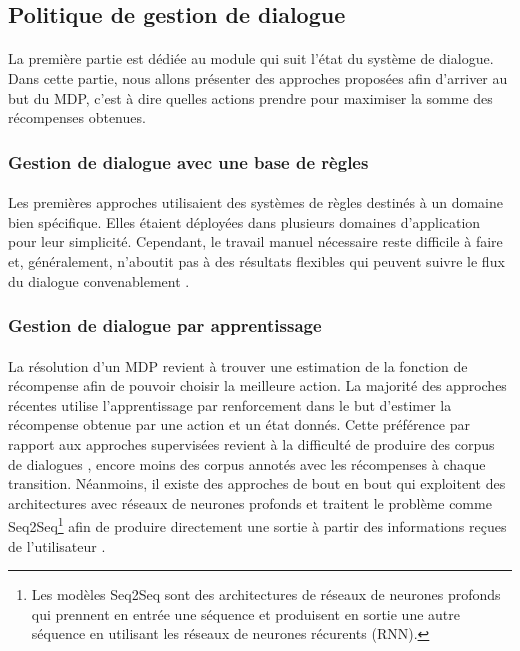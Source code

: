 \subsection{Politique de gestion de dialogue}
\paragraph{}
La première partie est dédiée au module qui suit l'état du système de dialogue. Dans cette partie, nous allons présenter des approches proposées afin d'arriver au but du MDP, c'est à dire quelles actions prendre pour maximiser la somme des récompenses obtenues.
\subsubsection{Gestion de dialogue avec une base de règles}
\paragraph{}
Les premières approches utilisaient des systèmes de règles destinés à un domaine bien spécifique. Elles étaient déployées dans plusieurs domaines d'application pour leur simplicité. Cependant, le travail manuel nécessaire reste difficile à faire et, généralement, n'aboutit pas à des résultats flexibles qui peuvent suivre le flux du dialogue convenablement \citep{Lee2010}.
\subsubsection{Gestion de dialogue par apprentissage}
\paragraph{}
La résolution d'un MDP revient à trouver une estimation de la fonction de récompense afin de pouvoir choisir la meilleure action. La majorité des approches récentes utilise l'apprentissage par renforcement dans le but d'estimer la récompense obtenue par une action et un état donnés. Cette préférence par rapport aux approches supervisées revient à la difficulté de produire des corpus de dialogues \citep{Henderson2008}, encore moins des corpus annotés avec les récompenses à chaque transition. Néanmoins, il existe des approches de bout en bout qui exploitent des architectures avec réseaux de neurones profonds et traitent le problème comme Seq2Seq\footnote{Les modèles Seq2Seq sont des architectures de réseaux de neurones profonds qui prennent en entrée une séquence et produisent en sortie une autre séquence en utilisant les réseaux de neurones récurents (RNN).} afin de produire directement une sortie à partir des informations reçues de l'utilisateur \citep{Wen2017,Serban2016}.


